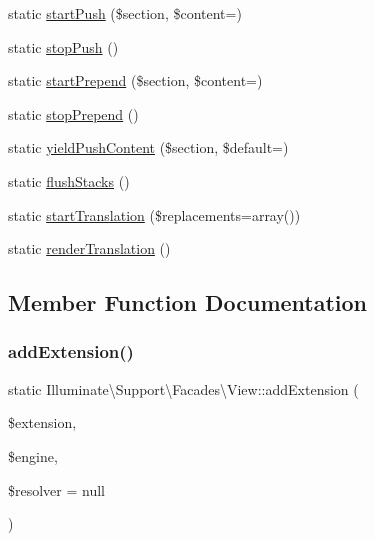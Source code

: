 \begin{DoxyCompactItemize}
static \mbox{\hyperlink{class_illuminate_1_1_support_1_1_facades_1_1_view_a2be8b6f2fd75d429a8dc44d131c85e9c}{start\+Push}} (\$section, \$content=\textquotesingle{}\textquotesingle{})
\item 
static \mbox{\hyperlink{class_illuminate_1_1_support_1_1_facades_1_1_view_a756138ec6e62d616cc8b9f8457c18d8d}{stop\+Push}} ()
\item 
static \mbox{\hyperlink{class_illuminate_1_1_support_1_1_facades_1_1_view_abab88bdc6829046c5c81fb49866d1223}{start\+Prepend}} (\$section, \$content=\textquotesingle{}\textquotesingle{})
\item 
static \mbox{\hyperlink{class_illuminate_1_1_support_1_1_facades_1_1_view_afed9e2d0bc20c62e23de4ac522dc3153}{stop\+Prepend}} ()
\item 
static \mbox{\hyperlink{class_illuminate_1_1_support_1_1_facades_1_1_view_a7cf4a7c83ce98459bdba562bf309d59d}{yield\+Push\+Content}} (\$section, \$default=\textquotesingle{}\textquotesingle{})
\item 
static \mbox{\hyperlink{class_illuminate_1_1_support_1_1_facades_1_1_view_a0dcb31addf81925d1863ca46cc867fac}{flush\+Stacks}} ()
\item 
static \mbox{\hyperlink{class_illuminate_1_1_support_1_1_facades_1_1_view_a15cdee3b7b96556ea3c0b22f92b2ca4d}{start\+Translation}} (\$replacements=array())
\item 
static \mbox{\hyperlink{class_illuminate_1_1_support_1_1_facades_1_1_view_ad81c607419b247b610151880dc8cd2a5}{render\+Translation}} ()
\end{DoxyCompactItemize}


\subsection{Member Function Documentation}
\mbox{\label{class_illuminate_1_1_support_1_1_facades_1_1_view_a40632186ece06ab9074020abfa7f12c6}} 
\subsubsection{\texorpdfstring{add\+Extension()}{addExtension()}}
{\footnotesize\ttfamily static Illuminate\textbackslash{}\+Support\textbackslash{}\+Facades\textbackslash{}\+View\+::add\+Extension (\begin{DoxyParamCaption}\item[{}]{\$extension,  }\item[{}]{\$engine,  }\item[{}]{\$resolver = {\ttfamily null} }\end{DoxyParamCaption})\hspace{0.3cm}{\ttfamily [static]}}

